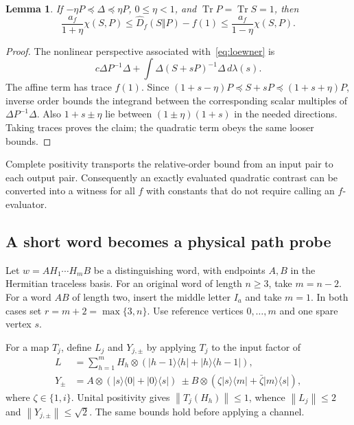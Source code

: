 \documentclass[11pt,a4paper]{article}
\newtheorem{lemma}[theorem]{Lemma}
\theoremstyle{definition}\newtheorem{definition}[theorem]{Definition}
\newcommand{\Tr}{\operatorname{Tr}}
\newcommand{\Dhat}{\widehat D}
\newcommand{\norm}[1]{\left\lVert #1\right\rVert}
\begin{document}
\begin{lemma}\label{lem:sandwich}
If $-\eta P\preceq\Delta\preceq\eta P$, $0\le\eta<1$, and $\Tr P=\Tr S=1$, then
\begin{equation}\label{eq:sandwich}
 \frac{a_f}{1+\eta}\chi(S,P)
 \le\Dhat_f(S\Vert P)-f(1)
 \le\frac{a_f}{1-\eta}\chi(S,P).
\end{equation}
\end{lemma}
\begin{proof}
The nonlinear perspective associated with~\eqref{eq:loewner} is
\[
 c\Delta P^{-1}\Delta+
 \int\Delta(S+sP)^{-1}\Delta\,d\lambda(s).
\]
The affine term has trace $f(1)$. Since
$(1+s-\eta)P\preceq S+sP\preceq(1+s+\eta)P$, inverse order bounds the integrand between the corresponding scalar multiples of $\Delta P^{-1}\Delta$. Also
$1+s\pm\eta$ lie between $(1\pm\eta)(1+s)$ in the needed directions. Taking traces proves the claim; the quadratic term obeys the same looser bounds.
\end{proof}

Complete positivity transports the relative-order bound from an input pair to each output pair. Consequently an exactly evaluated quadratic contrast can be converted into a witness for all $f$ with constants that do not require calling an $f$-evaluator.

\subsection{A short word becomes a physical path probe}

Let $w=A H_1\cdots H_m B$ be a distinguishing word, with endpoints $A,B$ in the Hermitian traceless basis. For an original word of length $n\ge3$, take $m=n-2$. For a word $AB$ of length two, insert the middle letter $I_a$ and take $m=1$. In both cases set $r=m+2=\max\{3,n\}$. Use reference vertices $0,\ldots,m$ and one spare vertex $s$.

For a map $T_j$, define $L_j$ and $Y_{j,\pm}$ by applying $T_j$ to the input factor of
\begin{align}
 L&=\sum_{h=1}^m H_h\otimes
 (|h-1\rangle\langle h|+|h\rangle\langle h-1|),\label{eq:L}\\
 Y_\pm&=A\otimes(|s\rangle\langle0|+|0\rangle\langle s|)
 \ \pm B\otimes(\zeta|s\rangle\langle m|+\bar\zeta|m\rangle\langle s|),\label{eq:Y}
\end{align}
where $\zeta\in\{1,i\}$. Unital positivity gives $\norm{T_j(H_h)}\le1$, whence
$\norm{L_j}\le2$ and $\norm{Y_{j,\pm}}\le\sqrt2$. The same bounds hold before applying a channel.
\end{document}
